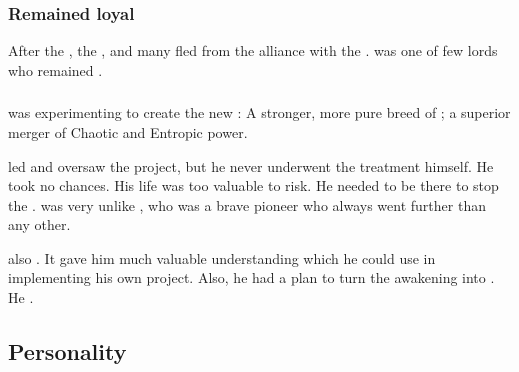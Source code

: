 \subsubsection{Remained loyal}
After the , the \resphain{} , and many fled from the alliance with the \banelords. 
\Azraid{} was one of few \resphan{} lords who remained . 





\subsubsection{\NeoResphain}
\Azraid{} was experimenting to create the new : 
A stronger, more pure breed of \resphan; a superior merger of Chaotic and Entropic power. 

\Azraid led and oversaw the \neoresphan project, but he never underwent the treatment himself. 
He took no chances. 
His life was too valuable to risk.
He needed to be there to stop the \banes.
\Azraid was very unlike \Sethicus, who was a brave pioneer who always went further than any other. 

\Azraid also .
It gave him much valuable understanding which he could use in implementing his own \neoresphan project. 
Also, he had a plan to turn the awakening \malachim into \neoresphain. 
He . 









\subsection{Personality}





